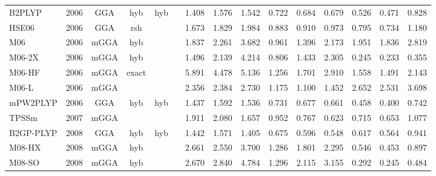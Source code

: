 \begin{landscape}
\begin{longtable}{lcccccrrrrrrrrr}
    B2PLYP           & 2006 & GGA  & hyb      & hyb         &           & 1.408             & 1.576             & 1.542  & 0.722              & 0.684             & 0.679  & 0.526   & 0.471 & 0.828 \\
    HSE06            & 2006 & GGA  & rsh      &             &           & 1.673             & 1.829             & 1.984  & 0.883              & 0.910             & 0.973  & 0.795   & 0.734 & 1.180 \\
    M06              & 2006 & mGGA & hyb      &             &           & 1.837             & 2.261             & 3.682  & 0.961              & 1.396             & 2.173  & 1.951   & 1.836 & 2.819 \\
    M06-2X           & 2006 & mGGA & hyb      &             &           & 1.496             & 2.139             & 4.214  & 0.806              & 1.433             & 2.305  & 0.245   & 0.233 & 0.355 \\
    M06-HF           & 2006 & mGGA & exact    &             &           & 5.891             & 4.478             & 5.136  & 1.256              & 1.701             & 2.910  & 1.558   & 1.491 & 2.143 \\
    M06-L            & 2006 & mGGA &          &             &           & 2.356             & 2.384             & 2.730  & 1.175              & 1.100             & 1.452  & 2.652   & 2.531 & 3.698 \\
    mPW2PLYP         & 2006 & GGA  & hyb      & hyb         &           & 1.437             & 1.592             & 1.536  & 0.731              & 0.677             & 0.661  & 0.458   & 0.400 & 0.742 \\
    TPSSm            & 2007 & mGGA &          &             &           & 1.911             & 2.080             & 1.657  & 0.952              & 0.767             & 0.623  & 0.715   & 0.653 & 1.077 \\
    B2GP-PLYP        & 2008 & GGA  & hyb      & hyb         &           & 1.442             & 1.571             & 1.405  & 0.675              & 0.596             & 0.548  & 0.617   & 0.564 & 0.941 \\
    M08-HX           & 2008 & mGGA & hyb      &             &           & 2.661             & 2.550             & 3.700  & 1.286              & 1.801             & 2.295  & 0.546   & 0.453 & 0.897 \\
    M08-SO           & 2008 & mGGA & hyb      &             &           & 2.670             & 2.840             & 4.784  & 1.296              & 2.115             & 3.155  & 0.292   & 0.245 & 0.484 \\

\end{longtable}
\end{landscape}
